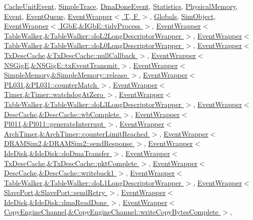 \hyperlink{classCacheUnitEvent_a6490f765a824ced1cc94979609fe7e07}{CacheUnitEvent}, \hyperlink{classSimpleTrace_a6490f765a824ced1cc94979609fe7e07}{SimpleTrace}, \hyperlink{classHDLcd_1_1DmaDoneEvent_a6490f765a824ced1cc94979609fe7e07}{DmaDoneEvent}, \hyperlink{classKernel_1_1Statistics_a6490f765a824ced1cc94979609fe7e07}{Statistics}, \hyperlink{classPhysicalMemory_a6490f765a824ced1cc94979609fe7e07}{PhysicalMemory}, \hyperlink{classEvent_adbcff144e5e199d332a1352af1798148}{Event}, \hyperlink{classEventQueue_adbcff144e5e199d332a1352af1798148}{EventQueue}, \hyperlink{classEventWrapper_a6490f765a824ced1cc94979609fe7e07}{EventWrapper$<$ T, F $>$}, \hyperlink{classGlobals_a9ad420f063400c6f6e81455a7c1b6180}{Globals}, \hyperlink{classSimObject_adbcff144e5e199d332a1352af1798148}{SimObject}, \hyperlink{classEventWrapper_a6490f765a824ced1cc94979609fe7e07}{EventWrapper$<$ IGbE,\&IGbE::tidvProcess $>$}, \hyperlink{classEventWrapper_a6490f765a824ced1cc94979609fe7e07}{EventWrapper$<$ TableWalker,\&TableWalker::doL2LongDescriptorWrapper $>$}, \hyperlink{classEventWrapper_a6490f765a824ced1cc94979609fe7e07}{EventWrapper$<$ TableWalker,\&TableWalker::doL0LongDescriptorWrapper $>$}, \hyperlink{classEventWrapper_a6490f765a824ced1cc94979609fe7e07}{EventWrapper$<$ TxDescCache,\&TxDescCache::nullCallback $>$}, \hyperlink{classEventWrapper_a6490f765a824ced1cc94979609fe7e07}{EventWrapper$<$ NSGigE,\&NSGigE::txEventTransmit $>$}, \hyperlink{classEventWrapper_a6490f765a824ced1cc94979609fe7e07}{EventWrapper$<$ SimpleMemory,\&SimpleMemory::release $>$}, \hyperlink{classEventWrapper_a6490f765a824ced1cc94979609fe7e07}{EventWrapper$<$ PL031,\&PL031::counterMatch $>$}, \hyperlink{classEventWrapper_a6490f765a824ced1cc94979609fe7e07}{EventWrapper$<$ Timer,\&Timer::watchdogAtZero $>$}, \hyperlink{classEventWrapper_a6490f765a824ced1cc94979609fe7e07}{EventWrapper$<$ TableWalker,\&TableWalker::doL3LongDescriptorWrapper $>$}, \hyperlink{classEventWrapper_a6490f765a824ced1cc94979609fe7e07}{EventWrapper$<$ DescCache,\&DescCache::wbComplete $>$}, \hyperlink{classEventWrapper_a6490f765a824ced1cc94979609fe7e07}{EventWrapper$<$ Pl011,\&Pl011::generateInterrupt $>$}, \hyperlink{classEventWrapper_a6490f765a824ced1cc94979609fe7e07}{EventWrapper$<$ ArchTimer,\&ArchTimer::counterLimitReached $>$}, \hyperlink{classEventWrapper_a6490f765a824ced1cc94979609fe7e07}{EventWrapper$<$ DRAMSim2,\&DRAMSim2::sendResponse $>$}, \hyperlink{classEventWrapper_a6490f765a824ced1cc94979609fe7e07}{EventWrapper$<$ IdeDisk,\&IdeDisk::doDmaTransfer $>$}, \hyperlink{classEventWrapper_a6490f765a824ced1cc94979609fe7e07}{EventWrapper$<$ TxDescCache,\&TxDescCache::pktComplete $>$}, \hyperlink{classEventWrapper_a6490f765a824ced1cc94979609fe7e07}{EventWrapper$<$ DescCache,\&DescCache::writeback1 $>$}, \hyperlink{classEventWrapper_a6490f765a824ced1cc94979609fe7e07}{EventWrapper$<$ TableWalker,\&TableWalker::doL1LongDescriptorWrapper $>$}, \hyperlink{classEventWrapper_a6490f765a824ced1cc94979609fe7e07}{EventWrapper$<$ SlavePort,\&SlavePort::sendRetry $>$}, \hyperlink{classEventWrapper_a6490f765a824ced1cc94979609fe7e07}{EventWrapper$<$ IdeDisk,\&IdeDisk::dmaReadDone $>$}, \hyperlink{classEventWrapper_a6490f765a824ced1cc94979609fe7e07}{EventWrapper$<$ CopyEngineChannel,\&CopyEngineChannel::writeCopyBytesComplete $>$}, 